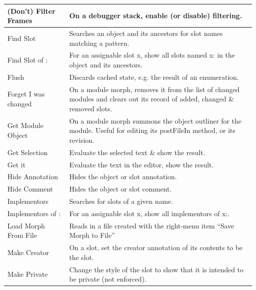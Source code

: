 \documentclass[letterpaper,10pt,english]{sphinxmanual}
\begin{document}
\begin{longtable}{p{5cm} p{10cm}}
(Don’t) Filter Frames
 & 
On a debugger stack, enable (or disable) filtering.
\\\hline

Find Slot
 & 
Searches an object and its ancestors for slot names matching a pattern.
\\\hline

Find Slot of :
 & 
For an assignable slot x, show all slots named x: in the object and its ancestors.
\\\hline

Flush
 & 
Discards cached state, e.g. the result of an enumeration.
\\\hline

Forget I was changed
 & 
On a module morph, removes it from the list of changed modules and clears out its record of added, changed \& removed slots.
\\\hline

Get Module Object
 & 
On a module morph summons the object outliner for the module. Useful for editing its postFileIn method, or its revision.
\\\hline

Get Selection
 & 
Evaluate the selected text \& show the result.
\\\hline

Get it
 & 
Evaluate the text in the editor, show the result.
\\\hline

Hide Annotation
 & 
Hides the object or slot annotation.
\\\hline

Hide Comment
 & 
Hides the object or slot comment.
\\\hline

Implementors
 & 
Searches for slots of a given name.
\\\hline

Implementors of :
 & 
For an assignable slot x, show all implementors of x:.
\\\hline

Load Morph From File
 & 
Reads in a file created with the right-menu item “Save Morph to File”
\\\hline

Make Creator
 & 
On a slot, set the creator annotation of its contents to be the slot.
\\\hline

Make Private
 & 
Change the style of the slot to show that it is intended to be private (not enforced).
\\\hline


\end{longtable}
\end{document}
